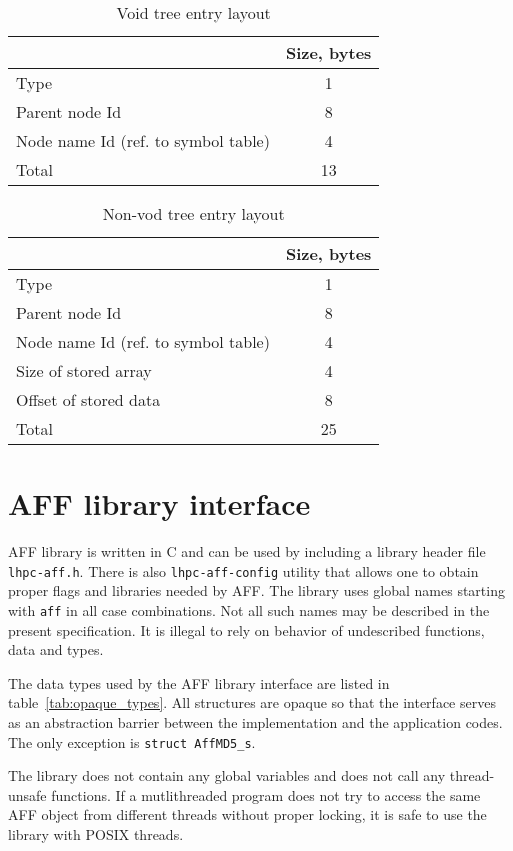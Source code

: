\documentclass[10pt,letterpaper]{article}
\newcommand{\bc}{\begin{center}}
\newcommand{\ec}{\end{center}}
\newcommand{\ctext}[1]{\texttt{#1}}         %
\newcommand{\ctype}[1]{\ctext{#1}}          %
\begin{document}
\begin{table}[h]
\bc
\caption{Void tree entry layout}
\label{tab:void}
\begin{tabular}{|l|c|} \hline
 & Size, bytes \\ \hline\hline
Type & 1 \\ \hline
Parent node Id & 8 \\ \hline
Node name Id (ref. to symbol table) & 4 \\ \hline\hline
Total & 13 \\ \hline
\end{tabular}
\ec
\end{table}

\begin{table}[h]
\bc
\caption{Non-vod tree entry layout}
\label{tab:tree_entry}
\begin{tabular}{|l|c|} \hline
 & Size, bytes \\ \hline\hline
Type & 1 \\ \hline
Parent node Id & 8 \\ \hline
Node name Id (ref. to symbol table) & 4 \\ \hline
Size of stored array & 4 \\ \hline
Offset of stored data & 8 \\ \hline\hline
Total & 25 \\ \hline
\end{tabular}
\ec
\end{table}

\section{AFF library interface}
AFF library is written in C and can be used by including a library
header file \verb|lhpc-aff.h|.  There is also \verb|lhpc-aff-config|
utility that allows one to obtain proper flags and libraries needed by
AFF.  The library uses global names starting with \verb|aff| in all case
combinations.  Not all such names may be described in the present
specification.  It is illegal to rely on behavior of undescribed
functions, data and types.

The data types used by the AFF library interface are listed in
table~\ref{tab:opaque_types}. All structures are opaque so that
the interface serves as an abstraction barrier between the
implementation and the application codes. The only exception is
\ctype{struct AffMD5\_s}.

The library does not contain any global variables and does not call
any thread-unsafe functions. If a mutlithreaded program does not try
to access the same AFF object from different threads without proper
locking, it is safe to use the library with POSIX threads.
\end{document}
